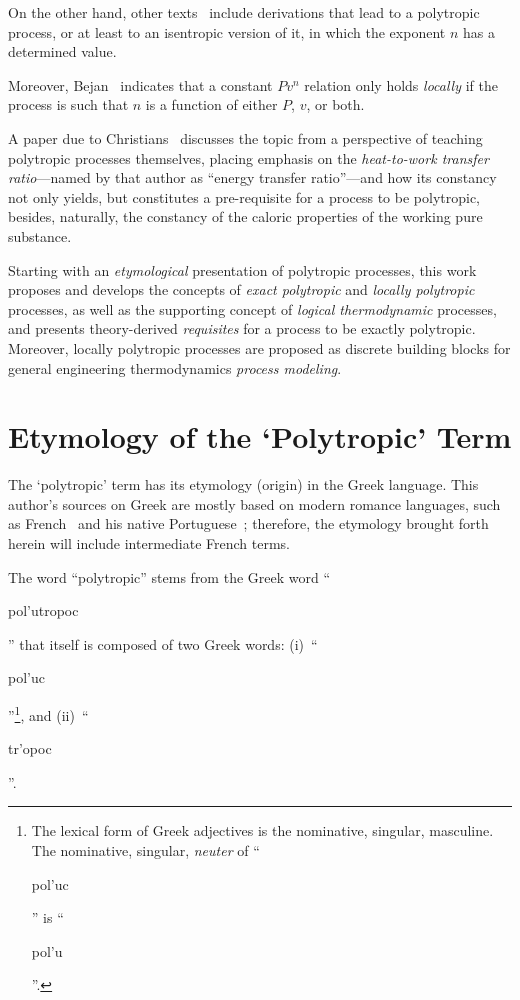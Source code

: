 \documentclass[fleqn,11pt]{SelfArx}
\newcommand{\GRtxt}[1]{\begin{otherlanguage}{greek}{{#1}}\end{otherlanguage}}
\begin{document}
    On  the  other  hand,  other  texts~\cite{1986-JonesJB+HawkinsGA-Wiley,   2006-BejanA-Wiley,
    2015-KroosKA+PotterMC-Cengage} include derivations that lead to a polytropic process, or  at
    least to an isentropic version of it, in which the exponent $n$ has a determined value.

    Moreover, Bejan~\cite[p.~175]{2006-BejanA-Wiley} indicates that a constant  $Pv^n$  relation
    only holds \emph{locally} if the process is such that $n$ is a function of either $P$,  $v$,
    or both.

    A paper due to Christians~\cite{2012-ChristiansJ-IntJMechEngEduc} discusses the topic from a
    perspective  of  teaching  polytropic  processes  themselves,  placing   emphasis   on   the
    \emph{heat-to-work transfer ratio}---named by that author as ``energy transfer ratio''---and
    how its constancy not only yields, but constitutes a  pre-requisite  for  a  process  to  be
    polytropic, besides, naturally, the constancy of the caloric properties of the working  pure
    substance.

    Starting with  an  \emph{etymological}  presentation  of  polytropic  processes,  this  work
    proposes and develops the concepts of \emph{exact polytropic} and \emph{locally  polytropic}
    processes, as well as the supporting concept of \emph{logical thermodynamic} processes,  and
    presents theory-derived \emph{requisites} for a process to be exactly polytropic.  Moreover,
    locally  polytropic  processes  are  proposed  as  discrete  building  blocks  for   general
    engineering thermodynamics \emph{process modeling}.

\section{Etymology of the `Polytropic' Term}

    The `polytropic' term has its etymology  (origin)  in  the  Greek  language.  This  author's
    sources   on   Greek   are   mostly   based   on   modern   romance   languages,   such   as
    French~\cite{1968-Chantraine-Klincksieck,    2000-BaillyA-Hachette}    and    his     native
    Portuguese~\cite{1997-ManiatoglouMPF-Porto}; therefore, the etymology brought  forth  herein
    will include intermediate French terms.

    The word ``polytropic'' stems from the Greek word  ``\GRtxt{pol'utropoc}''  that  itself  is
    composed of two Greek  words:  (i)~``\GRtxt{pol'uc}''\footnote{The  lexical  form  of  Greek
    adjectives is the nominative, singular, masculine. The nominative,  singular,  \emph{neuter}
    of ``\GRtxt{pol'uc}'' is ``\GRtxt{pol'u}''.}, and (ii)~``\GRtxt{tr'opoc}''.
\end{document}
